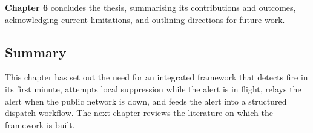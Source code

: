 \textbf{Chapter 6} concludes the thesis, summarising its contributions and outcomes, acknowledging current limitations, and outlining directions for future work.

\subsection{Summary}

This chapter has set out the need for an integrated framework that detects fire in its first minute, attempts local suppression while the alert is in flight, relays the alert when the public network is down, and feeds the alert into a structured dispatch workflow. The next chapter reviews the literature on which the framework is built.
